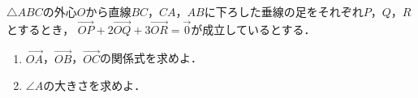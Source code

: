 \documentclass[../../main.tex]{subfiles}
\begin{document}
$\triangle ABC$の外心$O$から直線$BC$，$CA$，$AB$に下ろした垂線の足をそれぞれ$P$，$Q$，$R$とするとき，
$\overrightarrow{OP}+2\overrightarrow{OQ}+3\overrightarrow{OR}=\vec{0}$が成立しているとする．
\begin{enumerate}
  \item $\overrightarrow{OA}$，$\overrightarrow{OB}$，$\overrightarrow{OC}$の関係式を求めよ．
  \item $\angle A$の大きさを求めよ．
\end{enumerate}
\end{document}
